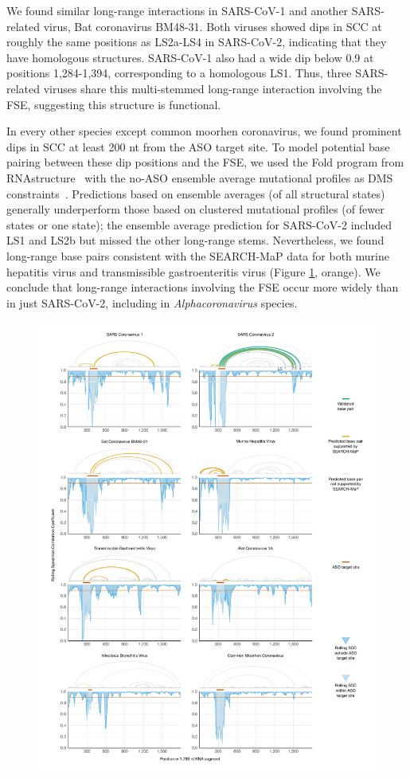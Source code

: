 \documentclass[main.tex]{subfiles}
\begin{document}
We found similar long-range interactions in SARS-CoV-1 and another SARS-related virus, Bat coronavirus BM48-31.
Both viruses showed dips in SCC at roughly the same positions as LS2a-LS4 in SARS-CoV-2, indicating that they have homologous structures.
SARS-CoV-1 also had a wide dip below 0.9 at positions 1,284-1,394, corresponding to a homologous LS1.
Thus, three SARS-related viruses share this multi-stemmed long-range interaction involving the FSE, suggesting this structure is functional.

In every other species except common moorhen coronavirus, we found prominent dips in SCC at least 200 nt from the ASO target site.
To model potential base pairing between these dip positions and the FSE, we used the Fold program from RNAstructure~\cite{Mathews2004a} with the no-ASO ensemble average mutational profiles as DMS constraints~\cite{Cordero2012}.
Predictions based on ensemble averages (of all structural states) generally underperform those based on clustered mutational profiles (of fewer states or one state); the ensemble average prediction for SARS-CoV-2 included LS1 and LS2b but missed the other long-range stems.
Nevertheless, we found long-range base pairs consistent with the SEARCH-MaP data for both murine hepatitis virus and transmissible gastroenteritis virus (Figure \ref{covs}, orange).
We conclude that long-range interactions involving the FSE occur more widely than in just SARS-CoV-2, including in \textit{Alphacoronavirus} species.


\begin{figure}[ht]
	\includegraphics[height=0.95\textheight]{../MainFigures/covs/covs.pdf}
	\caption{}
	\label{covs}
\end{figure}
\end{document}
